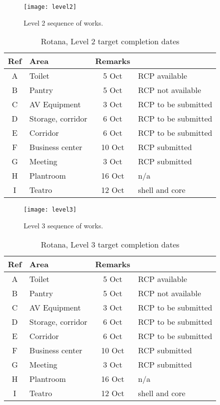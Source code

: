 
\begin{figure*}[htbp]
 \texttt{[image: level2]}
  \caption{Level 2 sequence of works.}
  \label{fig:level2}
\end{figure*}


\begin{table}[htbp]
\begin{center}
\begin{tabular}{clcl}
\toprule
Ref  & Area  & Remarks \\
\midrule
A    &Toilet   &5 Oct & RCP available  \\
B     &Pantry  &5 Oct &  RCP not available \\
C     &AV Equipment & 3 Oct &RCP to be submitted  \\
D     &Storage, corridor & 6 Oct & RCP to be submitted \\
E      &Corridor &6 Oct & RCP to be submitted \\
F     &Business center&10 Oct & RCP submitted \\
G    &Meeting &3 Oct & RCP submitted \\
H    &Plantroom &16 Oct & n/a \\
I     &Teatro &12 Oct & shell and core \\
\bottomrule
\end{tabular}
\caption{Rotana,  Level 2  target completion dates}
\end{center}
\end{table}


\begin{figure*}[htbp]
 \texttt{[image: level3]}
  \caption{Level 3 sequence of works.}
  \label{fig:level3}
\end{figure*}
\begin{table}[htbp]
\begin{center}
\begin{tabular}{clcl}
\toprule
Ref  & Area  & Remarks \\
\midrule
A    &Toilet   &5 Oct & RCP available  \\
B     &Pantry  &5 Oct &  RCP not available \\
C     &AV Equipment & 3 Oct &RCP to be submitted  \\
D     &Storage, corridor & 6 Oct & RCP to be submitted \\
E      &Corridor &6 Oct & RCP to be submitted \\
F     &Business center&10 Oct & RCP submitted \\
G    &Meeting &3 Oct & RCP submitted \\
H    &Plantroom &16 Oct & n/a \\
I     &Teatro &12 Oct & shell and core \\
\bottomrule
\end{tabular}
\caption{Rotana,  Level 3  target completion dates}
\end{center}
\end{table}


